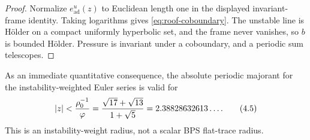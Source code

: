 \begin{proof}
Normalize \(e^u_{\mathrm{ad}}(z)\) to Euclidean length one in the displayed
invariant-frame identity.  Taking logarithms gives
\eqref{eq:roof-coboundary}.  The unstable
line is H\"older on a compact uniformly hyperbolic set, and the frame never
vanishes, so \(b\) is bounded H\"older.  Pressure is invariant under a
coboundary, and a periodic sum telescopes.
\end{proof}

As an immediate quantitative consequence, the absolute periodic majorant for
the instability-weighted Euler series is valid for
\[
 |z|<\frac{\rho_0^{-1}}{\varphi}
 =\frac{\sqrt{17}+\sqrt{13}}{1+\sqrt5}
 =2.38828632613\ldots .
 \tag{4.5}\label{eq:euler-radius}
\]
This is an instability-weight radius, not a scalar BPS flat-trace radius.

